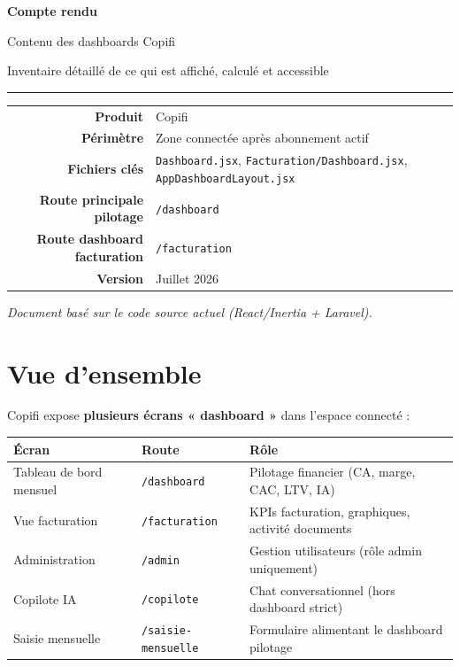 \documentclass[11pt,a4paper]{report}
\newcommand{\filepath}[1]{\texttt{\small #1}}
\newcommand{\route}[1]{\texttt{\small #1}}
\begin{document}
\begin{titlepage}
    \centering
    \vspace*{1cm}
    {\Huge\bfseries\color{copifiobsidian} Compte rendu\par}
    \vspace{0.5cm}
    {\LARGE\color{copifiemerald} Contenu des dashboards Copifi\par}
    \vspace{0.35cm}
    {\large Inventaire détaillé de ce qui est affiché, calculé et accessible\par}
    \vspace{1.2cm}
    \rule{0.82\textwidth}{1pt}
    \vspace{0.9cm}
    \begin{tabular}{>{\bfseries}r p{9.4cm}}
        Produit & Copifi \\
        Périmètre & Zone connectée après abonnement actif \\
        Fichiers clés & \filepath{Dashboard.jsx}, \filepath{Facturation/Dashboard.jsx}, \filepath{AppDashboardLayout.jsx} \\
        Route principale pilotage & \route{/dashboard} \\
        Route dashboard facturation & \route{/facturation} \\
        Version & Juillet 2026 \\
    \end{tabular}
    \vfill
    \small\itshape
    Document basé sur le code source actuel (React/Inertia + Laravel).
\end{titlepage}

\tableofcontents
\cleardoublepage

\chapter{Vue d'ensemble}

Copifi expose \textbf{plusieurs écrans « dashboard »} dans l'espace connecté :

\begin{center}
\begin{tabular}{@{}p{3.2cm}p{2.5cm}p{7.8cm}@{}}
\toprule
\textbf{Écran} & \textbf{Route} & \textbf{Rôle} \\
\midrule
Tableau de bord mensuel & \route{/dashboard} & Pilotage financier (CA, marge, CAC, LTV, IA) \\
Vue facturation & \route{/facturation} & KPIs facturation, graphiques, activité documents \\
Administration & \route{/admin} & Gestion utilisateurs (rôle admin uniquement) \\
Copilote IA & \route{/copilote} & Chat conversationnel (hors dashboard strict) \\
Saisie mensuelle & \route{/saisie-mensuelle} & Formulaire alimentant le dashboard pilotage \\
\bottomrule
\end{tabular}
\end{center}
\end{document}
